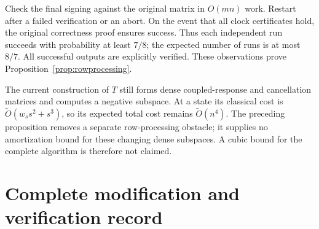 \documentclass[11pt]{amsart}
\theoremstyle{remark}\newtheorem{remark}[theorem]{Remark}
\begin{document}
Check the final signing against the original matrix in $O(mn)$ work.
Restart after a failed verification or an abort. On the event that all
clock certificates hold, the original correctness proof ensures success.
Thus each independent run succeeds with probability at least $7/8$;
the expected number of runs is at most $8/7$. All successful outputs are
explicitly verified. These observations prove
Proposition~\ref{prop:rowprocessing}.

The current construction of $T$ still forms dense coupled-response and
cancellation matrices and computes a negative subspace. At a state its
classical cost is $\widetilde O(w_s s^2+s^3)$, so its expected total cost
remains $\widetilde O(n^4)$. The preceding proposition removes a separate
row-processing obstacle; it supplies no amortization bound for these
changing dense subspaces. A cubic bound for the complete algorithm is
therefore not claimed.
\section{Complete modification and verification record}
\end{document}
